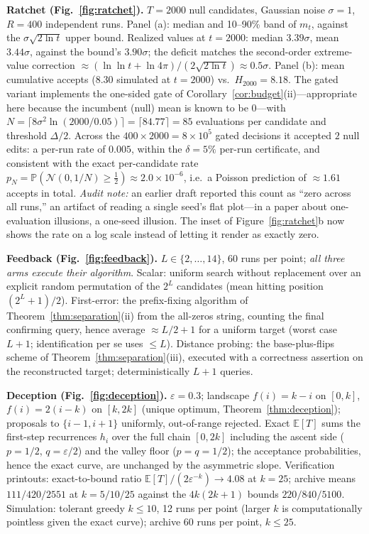 \documentclass{article}
\theoremstyle{plain}
\theoremstyle{definition}
\theoremstyle{remark}
\newcommand{\E}{\mathbb{E}}
\renewcommand{\P}{\mathbb{P}}
\newcommand{\eps}{\varepsilon}
\begin{document}
\textbf{Ratchet (Fig.~\ref{fig:ratchet}).} $T = 2000$ null candidates, Gaussian noise $\sigma = 1$, $R = 400$ independent runs. Panel (a): median and 10--90\% band of $m_t$, against the $\sigma\sqrt{2\ln t}$ upper bound. Realized values at $t = 2000$: median $3.39\sigma$, mean $3.44\sigma$, against the bound's $3.90\sigma$; the deficit matches the second-order extreme-value correction $\approx (\ln\ln t + \ln 4\pi)/(2\sqrt{2\ln t}) \approx 0.5\sigma$. Panel (b): mean cumulative accepts ($8.30$ simulated at $t=2000$) vs.\ $H_{2000} = 8.18$. The gated variant implements the one-sided gate of Corollary~\ref{cor:budget}(ii)---appropriate here because the incumbent (null) mean is known to be $0$---with $N = \lceil 8\sigma^2 \ln(2000/0.05) \rceil = \lceil 84.77 \rceil = 85$ evaluations per candidate and threshold $\Delta/2$. Across the $400 \times 2000 = 8\times10^5$ gated decisions it accepted $2$ null edits: a per-run rate of $0.005$, within the $\delta = 5\%$ per-run certificate, and consistent with the exact per-candidate rate $p_N = \P(\mathcal{N}(0, 1/N) \ge \tfrac12) \approx 2.0\times10^{-6}$, i.e.\ a Poisson prediction of $\approx 1.61$ accepts in total. \emph{Audit note:} an earlier draft reported this count as ``zero across all runs,'' an artifact of reading a single seed's flat plot---in a paper about one-evaluation illusions, a one-seed illusion. The inset of Figure~\ref{fig:ratchet}b now shows the rate on a log scale instead of letting it render as exactly zero.

\textbf{Feedback (Fig.~\ref{fig:feedback}).} $L \in \{2, \dots, 14\}$, 60 runs per point; \emph{all three arms execute their algorithm}. Scalar: uniform search without replacement over an explicit random permutation of the $2^L$ candidates (mean hitting position $(2^L+1)/2$). First-error: the prefix-fixing algorithm of Theorem~\ref{thm:separation}(ii) from the all-zeros string, counting the final confirming query, hence average $\approx L/2 + 1$ for a uniform target (worst case $L+1$; identification per se uses $\le L$). Distance probing: the base-plus-flips scheme of Theorem~\ref{thm:separation}(iii), executed with a correctness assertion on the reconstructed target; deterministically $L+1$ queries.

\textbf{Deception (Fig.~\ref{fig:deception}).} $\eps = 0.3$; landscape $f(i) = k - i$ on $[0,k]$, $f(i) = 2(i-k)$ on $[k,2k]$ (unique optimum, Theorem~\ref{thm:deception}); proposals to $\{i-1,i+1\}$ uniformly, out-of-range rejected. Exact $\E[T]$ sums the first-step recurrences $h_i$ over the full chain $[0, 2k]$ including the ascent side ($p = 1/2$, $q = \eps/2$) and the valley floor ($p = q = 1/2$); the acceptance probabilities, hence the exact curve, are unchanged by the asymmetric slope. Verification printouts: exact-to-bound ratio $\E[T] / (2\eps^{-k}) \to 4.08$ at $k = 25$; archive means $111 / 420 / 2551$ at $k = 5/10/25$ against the $4k(2k+1)$ bounds $220 / 840 / 5100$. Simulation: tolerant greedy $k \le 10$, 12 runs per point (larger $k$ is computationally pointless given the exact curve); archive 60 runs per point, $k \le 25$.
\end{document}
